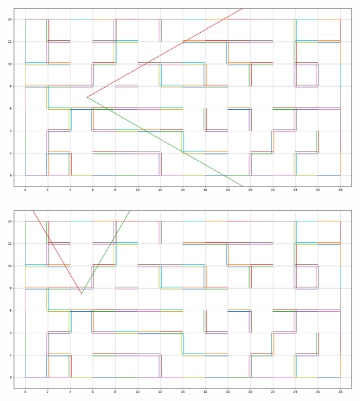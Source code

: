 \documentclass[runningheads]{llncs}
\begin{document}
\begin{figure}
	\centering
	\begin{subfigure}[b]{0.49\textwidth}
		\centering
		\includegraphics[width=\textwidth]{imgs/agent_map_sensor0.png}
		\caption{}
	\end{subfigure}
	\begin{subfigure}[b]{0.49\textwidth}
		\centering
		\includegraphics[width=\textwidth]{imgs/agent_map_sensor1.png}
		\caption{}
	\end{subfigure}
	

\end{figure}
\end{document}
